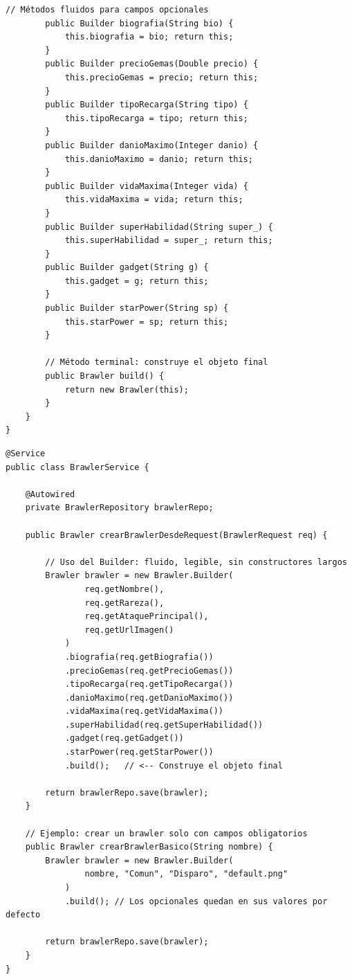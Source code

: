 \documentclass[12pt,a4paper]{article}
\begin{document}
\begin{lstlisting}[caption={Brawler.java -- La entidad con Builder interno}]
        // Métodos fluidos para campos opcionales
        public Builder biografia(String bio) {
            this.biografia = bio; return this;
        }
        public Builder precioGemas(Double precio) {
            this.precioGemas = precio; return this;
        }
        public Builder tipoRecarga(String tipo) {
            this.tipoRecarga = tipo; return this;
        }
        public Builder danioMaximo(Integer danio) {
            this.danioMaximo = danio; return this;
        }
        public Builder vidaMaxima(Integer vida) {
            this.vidaMaxima = vida; return this;
        }
        public Builder superHabilidad(String super_) {
            this.superHabilidad = super_; return this;
        }
        public Builder gadget(String g) {
            this.gadget = g; return this;
        }
        public Builder starPower(String sp) {
            this.starPower = sp; return this;
        }

        // Método terminal: construye el objeto final
        public Brawler build() {
            return new Brawler(this);
        }
    }
}
\end{lstlisting}

\begin{lstlisting}[caption={BrawlerService.java -- Uso del Builder para crear brawlers}]
@Service
public class BrawlerService {

    @Autowired
    private BrawlerRepository brawlerRepo;

    public Brawler crearBrawlerDesdeRequest(BrawlerRequest req) {

        // Uso del Builder: fluido, legible, sin constructores largos
        Brawler brawler = new Brawler.Builder(
                req.getNombre(),
                req.getRareza(),
                req.getAtaquePrincipal(),
                req.getUrlImagen()
            )
            .biografia(req.getBiografia())
            .precioGemas(req.getPrecioGemas())
            .tipoRecarga(req.getTipoRecarga())
            .danioMaximo(req.getDanioMaximo())
            .vidaMaxima(req.getVidaMaxima())
            .superHabilidad(req.getSuperHabilidad())
            .gadget(req.getGadget())
            .starPower(req.getStarPower())
            .build();   // <-- Construye el objeto final

        return brawlerRepo.save(brawler);
    }

    // Ejemplo: crear un brawler solo con campos obligatorios
    public Brawler crearBrawlerBasico(String nombre) {
        Brawler brawler = new Brawler.Builder(
                nombre, "Comun", "Disparo", "default.png"
            )
            .build(); // Los opcionales quedan en sus valores por defecto

        return brawlerRepo.save(brawler);
    }
}
\end{lstlisting}
\end{document}
